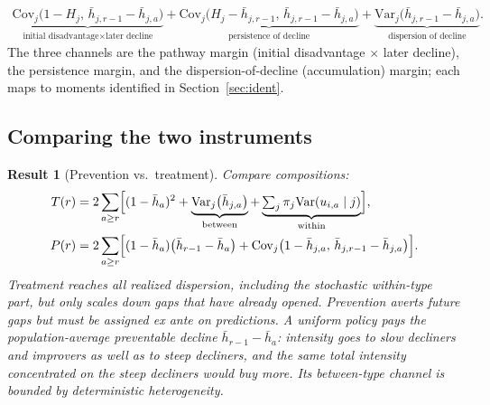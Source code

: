\documentclass[11pt]{article}
\newtheorem{result}{Result}
\theoremstyle{remark}
\newcommand{\Var}{\mathrm{Var}}
\newcommand{\Cov}{\mathrm{Cov}}
\begin{document}
\begin{itemize}
\begin{equation}
\begin{gathered}
		\underbrace{\Cov_j\bigl(1-H_j,\,\bar h_{j,r-1}-\bar h_{j,a}\bigr)}_{\text{initial disadvantage}\times\text{later decline}}
		+
		\underbrace{\Cov_j\bigl(H_j-\bar h_{j,r-1},\,\bar h_{j,r-1}-\bar h_{j,a}\bigr)}_{\text{persistence of decline}}
		+
		\underbrace{\Var_j\bigl(\bar h_{j,r-1}-\bar h_{j,a}\bigr)}_{\text{dispersion of decline}} .
	\end{gathered}
\label{eq:covdecomp}
\end{equation}
The three channels are the pathway margin (initial disadvantage $\times$ later decline), the persistence margin, and the dispersion-of-decline (accumulation) margin; each maps to moments identified in Section~\ref{sec:ident}.
\end{itemize}

\subsection{Comparing the two instruments}\label{sec:compare}

\begin{result}[Prevention vs.\ treatment]\label{res:T3}
Compare compositions:
\begin{align}
T(r) &= 2\sum_{a\ge r}\Bigl[(1-\bar h_a)^2 + \underbrace{\Var_j\bigl(\bar h_{j,a}\bigr)}_{\text{between}}
+ \underbrace{\textstyle\sum_j\pi_j\Var(u_{i,a}\mid j)}_{\text{within}}\Bigr], \\
P(r) &= 2\sum_{a\ge r}\Bigl[(1-\bar h_a)\bigl(\bar h_{r-1}-\bar h_a\bigr) + \Cov_j\bigl(1-\bar h_{j,a},\,\bar h_{j,r-1}-\bar h_{j,a}\bigr)\Bigr].
\end{align}
Treatment reaches all realized dispersion, including the stochastic within-type part, but only scales down gaps that have already opened.
Prevention averts future gaps but must be assigned ex ante on predictions.
A uniform policy pays the population-average preventable decline $\bar h_{r-1}-\bar h_a$: intensity goes to slow decliners and improvers as well as to steep decliners, and the same total intensity concentrated on the steep decliners would buy more.
Its between-type channel is bounded by deterministic heterogeneity.
\end{result}
\end{document}
